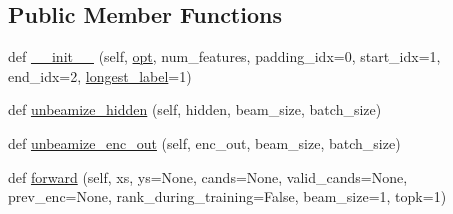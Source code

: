 \subsection*{Public Member Functions}
\begin{DoxyCompactItemize}
\item 
def \hyperlink{classparlai_1_1agents_1_1legacy__agents_1_1seq2seq_1_1modules__v0_1_1Seq2seq_a18cac7233148ad9fd4e6a0ea290d4dbc}{\+\_\+\+\_\+init\+\_\+\+\_\+} (self, \hyperlink{classparlai_1_1agents_1_1legacy__agents_1_1seq2seq_1_1modules__v0_1_1Seq2seq_a2e60b16af41691a50e1c01373ee84490}{opt}, num\+\_\+features, padding\+\_\+idx=0, start\+\_\+idx=1, end\+\_\+idx=2, \hyperlink{classparlai_1_1agents_1_1legacy__agents_1_1seq2seq_1_1modules__v0_1_1Seq2seq_af2d1dd10d9adf8062267fb8b61920296}{longest\+\_\+label}=1)
\item 
def \hyperlink{classparlai_1_1agents_1_1legacy__agents_1_1seq2seq_1_1modules__v0_1_1Seq2seq_adab65a09af78ad2a9bcdca010f0d0fe6}{unbeamize\+\_\+hidden} (self, hidden, beam\+\_\+size, batch\+\_\+size)
\item 
def \hyperlink{classparlai_1_1agents_1_1legacy__agents_1_1seq2seq_1_1modules__v0_1_1Seq2seq_a0c0270e1e4c3f72bca49d3752d90baab}{unbeamize\+\_\+enc\+\_\+out} (self, enc\+\_\+out, beam\+\_\+size, batch\+\_\+size)
\item 
def \hyperlink{classparlai_1_1agents_1_1legacy__agents_1_1seq2seq_1_1modules__v0_1_1Seq2seq_a5c8f9eaa59a088164f0e23de5ca37c67}{forward} (self, xs, ys=None, cands=None, valid\+\_\+cands=None, prev\+\_\+enc=None, rank\+\_\+during\+\_\+training=False, beam\+\_\+size=1, topk=1)
\end{DoxyCompactItemize}
